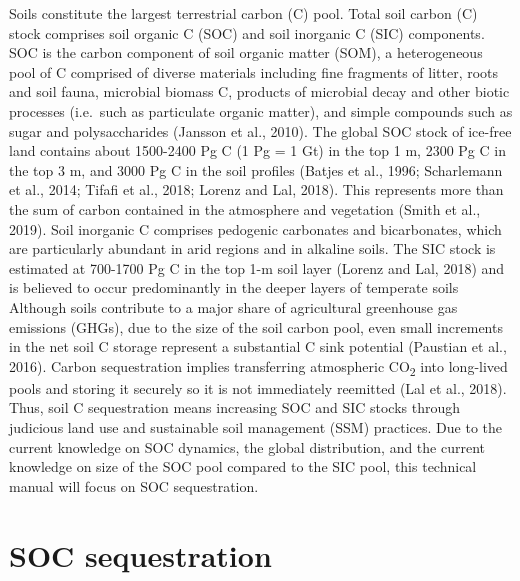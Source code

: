 \documentclass[
  10pt,
  b5paper,
]{book}
\begin{document}
Soils constitute the largest terrestrial carbon (C) pool. Total soil carbon (C) stock comprises soil organic C (SOC) and soil inorganic C (SIC) components. SOC is the carbon component of soil organic matter (SOM), a heterogeneous pool of C comprised of diverse materials including fine fragments of litter, roots and soil fauna, microbial biomass C, products of microbial decay and other biotic processes (i.e.~such as particulate organic matter), and simple compounds such as sugar and polysaccharides (Jansson et al., 2010). The global SOC stock of ice-free land contains about 1500-2400 Pg C (1 Pg = 1 Gt) in the top 1 m, 2300 Pg C in the top 3 m, and 3000 Pg C in the soil profiles (Batjes et al., 1996; Scharlemann et al., 2014; Tifafi et al., 2018; Lorenz and Lal, 2018). This represents more than the sum of carbon contained in the atmosphere and vegetation (Smith et al., 2019). Soil inorganic C comprises pedogenic carbonates and bicarbonates, which are particularly abundant in arid regions and in alkaline soils. The SIC stock is estimated at 700-1700 Pg C in the top 1-m soil layer (Lorenz and Lal, 2018) and is believed to occur predominantly in the deeper layers of temperate soils
Although soils contribute to a major share of agricultural greenhouse gas emissions (GHGs), due to the size of the soil carbon pool, even small increments in the net soil C storage represent a substantial C sink potential (Paustian et al., 2016). Carbon sequestration implies transferring atmospheric CO\textsubscript{2} into long-lived pools and storing it securely so it is not immediately reemitted (Lal et al., 2018). Thus, soil C sequestration means increasing SOC and SIC stocks through judicious land use and sustainable soil management (SSM) practices. Due to the current knowledge on SOC dynamics, the global distribution, and the current knowledge on size of the SOC pool compared to the SIC pool, this technical manual will focus on SOC sequestration.

\hypertarget{soc-sequestration}{%
\section{SOC sequestration}\label{soc-sequestration}}
\end{document}
